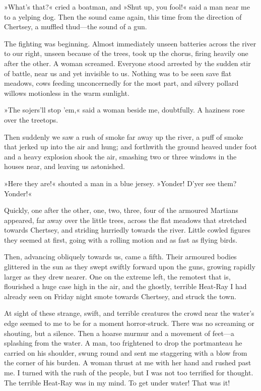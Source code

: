 »What's that?« cried a boatman, and »Shut up, you fool!« said a man near me to a yelping dog. Then the sound came again, this time from the direction of Chertsey, a muffled thud—the sound of a gun.

The fighting was beginning. Almost immediately unseen batteries across the river to our right, unseen because of the trees, took up the chorus, firing heavily one after the other. A woman screamed. Everyone stood arrested by the sudden stir of battle, near us and yet invisible to us. Nothing was to be seen save flat meadows, cows feeding unconcernedly for the most part, and silvery pollard willows motionless in the warm sunlight.

»The sojers'll stop 'em,« said a woman beside me, doubtfully. A haziness rose over the treetops.

Then suddenly we saw a rush of smoke far away up the river, a puff of smoke that jerked up into the air and hung; and forthwith the ground heaved under foot and a heavy explosion shook the air, smashing two or three windows in the houses near, and leaving us astonished.

»Here they are!« shouted a man in a blue jersey. »Yonder! D'yer see them? Yonder!«

Quickly, one after the other, one, two, three, four of the armoured Martians appeared, far away over the little trees, across the flat meadows that stretched towards Chertsey, and striding hurriedly towards the river. Little cowled figures they seemed at first, going with a rolling motion and as fast as flying birds.

Then, advancing obliquely towards us, came a fifth. Their armoured bodies glittered in the sun as they swept swiftly forward upon the guns, growing rapidly larger as they drew nearer. One on the extreme left, the remotest that is, flourished a huge case high in the air, and the ghostly, terrible Heat-Ray I had already seen on Friday night smote towards Chertsey, and struck the town.

At sight of these strange, swift, and terrible creatures the crowd near the water's edge seemed to me to be for a moment horror-struck. There was no screaming or shouting, but a silence. Then a hoarse murmur and a movement of feet—a splashing from the water. A man, too frightened to drop the portmanteau he carried on his shoulder, swung round and sent me staggering with a blow from the corner of his burden. A woman thrust at me with her hand and rushed past me. I turned with the rush of the people, but I was not too terrified for thought. The terrible Heat-Ray was in my mind. To get under water! That was it!

